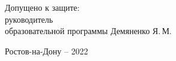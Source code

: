 \begin{singlespacing}
\begin{center}
\vspace{15mm}

\noindent
\begin{flushleft}
Допущено к защите:\\
руководитель \\
образовательной программы \underline{\hspace*{60mm}} Демяненко Я.\,М.
\end{flushleft}




\vfill
Ростов-на-Дону -- 2022

\end{center} 

\singlespacing
\end{singlespacing}